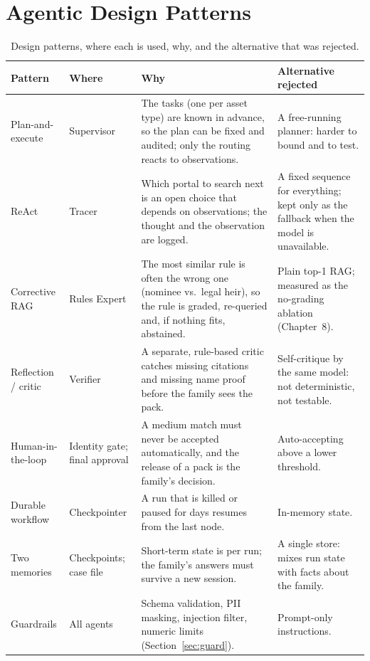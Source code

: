 \documentclass[12pt,a4paper,oneside]{report}
\begin{document}
\section{Agentic Design Patterns}
\begin{table}[H]
\centering\footnotesize{}
\caption[Design patterns]{Design patterns, where each is used, why, and the alternative that was rejected.}\label{tab:patterns}
\renewcommand{\arraystretch}{1.1}
\begin{tabularx}{\linewidth}{@{}p{2.3cm}p{2.3cm}XX@{}}
\toprule
\textbf{Pattern} & \textbf{Where} & \textbf{Why} & \textbf{Alternative rejected} \\ \midrule
Plan-and-execute & Supervisor & The tasks (one per asset type) are known in advance, so the plan can be fixed and audited; only the routing reacts to observations. & A free-running planner: harder to bound and to test. \\
ReAct & Tracer & Which portal to search next is an open choice that depends on observations; the thought and the observation are logged. & A fixed sequence for everything; kept only as the fallback when the model is unavailable. \\
Corrective RAG & Rules Expert & The most similar rule is often the wrong one (nominee vs.\ legal heir), so the rule is graded, re-queried and, if nothing fits, abstained. & Plain top-1 RAG; measured as the no-grading ablation (Chapter~8). \\
Reflection / critic & Verifier & A separate, rule-based critic catches missing citations and missing name proof before the family sees the pack. & Self-critique by the same model: not deterministic, not testable. \\
Human-in-the-loop & Identity gate; final approval & A medium match must never be accepted automatically, and the release of a pack is the family's decision. & Auto-accepting above a lower threshold. \\
Durable workflow & Checkpointer & A run that is killed or paused for days resumes from the last node. & In-memory state. \\
Two memories & Checkpoints; case file & Short-term state is per run; the family's answers must survive a new session. & A single store: mixes run state with facts about the family. \\
Guardrails & All agents & Schema validation, PII masking, injection filter, numeric limits (Section~\ref{sec:guard}). & Prompt-only instructions. \\ \bottomrule
\end{tabularx}
\end{table}
\end{document}
